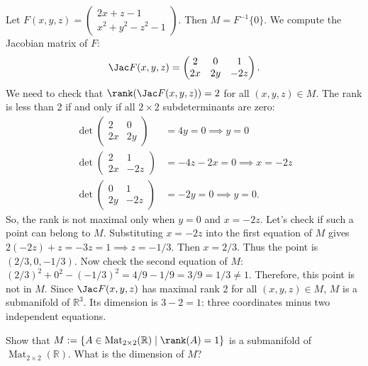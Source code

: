 \begin{exercisesolution}
Let $F(x,y,z) = \begin{pmatrix} 2x+z-1 \\ x^2+y^2-z^2-1 \end{pmatrix}$. Then $M = F^{-1}\{0\}$.
We compute the Jacobian matrix of $F$:
\[ \Jac F(x,y,z) = \begin{pmatrix} 2 & 0 & 1 \\ 2x & 2y & -2z \end{pmatrix}. \]
We need to check that $\rank(\Jac F(x,y,z)) = 2$ for all $(x,y,z) \in M$.
The rank is less than 2 if and only if all $2 \times 2$ subdeterminants are zero:
\begin{align*}
\det \begin{pmatrix} 2 & 0 \\ 2x & 2y \end{pmatrix} &= 4y = 0 \implies y = 0 \\
\det \begin{pmatrix} 2 & 1 \\ 2x & -2z \end{pmatrix} &= -4z - 2x = 0 \implies x = -2z \\
\det \begin{pmatrix} 0 & 1 \\ 2y & -2z \end{pmatrix} &= -2y = 0 \implies y = 0.
\end{align*}
So, the rank is not maximal only when $y=0$ and $x=-2z$.
Let's check if such a point can belong to $M$. Substituting $x=-2z$ into the first equation of $M$ gives $2(-2z) + z = -3z = 1 \implies z = -1/3$.
Then $x = 2/3$. Thus the point is $(2/3, 0, -1/3)$.
Now check the second equation of $M$: $(2/3)^2 + 0^2 - (-1/3)^2 = 4/9 - 1/9 = 3/9 = 1/3 \neq 1$.
Therefore, this point is not in $M$.
Since $\Jac F(x,y,z)$ has maximal rank 2 for all $(x,y,z) \in M$, $M$ is a submanifold of $\mathbb{R}^3$.
Its dimension is $3 - 2 = 1$: three coordinates minus two independent equations.
\end{exercisesolution}

\begin{exercise}
\label{ex:submanifold_matrices_rank1}
Show that $M := \{ A \in \operatorname{Mat}_{2\times 2}(\mathbb{R}) \mid \rank(A) = 1 \}$ is a submanifold of $\operatorname{Mat}_{2\times 2}(\mathbb{R})$. What is the dimension of $M$?
\end{exercise}

